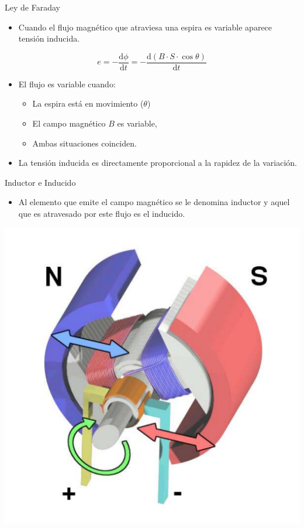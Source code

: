 \documentclass[xcolor={usenames,svgnames,dvipsnames}]{beamer}
\begin{document}
\begin{frame}[label={sec:org1ce76c4}]{Ley de Faraday}
\begin{itemize}
\item Cuando el \alert{flujo magnético} que atraviesa una espira es \alert{variable}
aparece \alert{tensión inducida}.
\end{itemize}

\[
e=-\frac{\mathrm{d}\phi}{\mathrm{d}t} = -\frac{\mathrm{d}(B \cdot S\cdot \cos \theta)}{\mathrm{d}t} 
\]

\begin{itemize}
\item El flujo es variable cuando:

\begin{itemize}
\item La \alert{espira está en movimiento} (\(\theta\))

\item El \alert{campo magnético \(B\) es variable},

\item Ambas situaciones coinciden.
\end{itemize}

\item La tensión inducida es directamente proporcional a la rapidez de la
variación.
\end{itemize}
\end{frame}


\begin{frame}[label={sec:org859a188}]{Inductor e Inducido}
\begin{itemize}
\item Al elemento que emite el campo magnético se le denomina \alert{inductor} y
aquel que es atravesado por este flujo es el \alert{inducido}.
\end{itemize}
\begin{center}
\includegraphics[height=0.7\textheight]{../figs/Electric_motor_cycle_3.pdf}
\end{center}
\end{frame}
\end{document}
